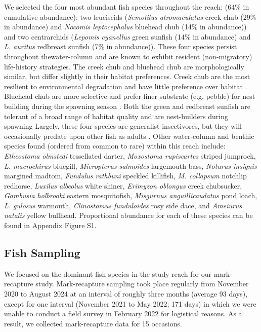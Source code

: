\documentclass[11pt, class=article, crop=false]{standalone}
\begin{document}
We selected the four most abundant fish species throughout the reach: (64\% in cumulative abundance): two leuciscids (\textit{Semotilus atromaculatus} creek chub (29\% in abundance) and \textit{Nocomis leptocephalus} bluehead chub  (14\% in abundance)) and two centrarchids (\textit{Lepomis cyanellus} green sunfish (14\% in abundance) and \textit{L. auritus} redbreast sunfish (7\% in abundance)). These four species persist throughout thewater-column and are known to exhibit resident (non-migratory) life-history strategies\citep{teruiNonrandomDispersalSympatric2021}. The creek chub and bluehead chub are morphologically similar, but differ slightly in their habitat preferences. Creek chub are the most resilient to environmental degradation and have little preference over habitat \citep{ mccormick 2001, bramblett 2005}. Bluehead chub are more selective and prefer finer substrate (e.g. pebble) for nest building during the spawning season \citep{evelyn 2023 }. Both the green and redbreast sunfish are tolerant of a broad range of habitat quality and are nest-builders during spawning \citep{wernerCompetitionHabitatShift1977, helms, etnier and starnes} Largely, these four species are generalist insectivores, but they will occasionally predate upon other fish as adults \citep{wernerCompetitionHabitatShift1977, teruiNonrandomDispersalSympatric2021, helms 2018, etnier and starnes 1993}. Other water-column and benthic species found (ordered from common to rare) within this reach include: \textit{Etheostoma olmstedi} tessellated darter, \textit{Moxostoma rupiscartes} striped jumprock, \textit{L. macrochirus} bluegill, \textit{Micropterus salmoides} largemouth bass, \textit{Noturus insignis} margined madtom, \textit{Fundulus rathbuni} speckled killifish, \textit{M. collapsum} notchlip redhorse, \textit{Luxilus albeolus} white shiner, \textit{Erimyzon oblongus} creek chubsucker, \textit{Gambusia holbrooki} eastern mosquitofish, \textit{Misgurnus anguillicaudatus} pond loach, \textit{L. gulosus} warmouth, \textit{Clinostomus funduloides} rosy side dace, and \textit{Ameiurus natalis} yellow bullhead. Proportional abundance for each of these species can be found in Appendix Figure S1.

\subsection{Fish Sampling}

We focused on the dominant fish species in the study reach for our mark-recapture study. Mark-recapture sampling took place regularly from November 2020 to August 2024 at an interval of roughly three months (average 93 days), except for one interval (November 2021 to May 2022; 171 days) in which we were unable to conduct a field survey in February 2022 for logistical reasons. As a result, we collected mark-recapture data for 15 occasions.
\end{document}
